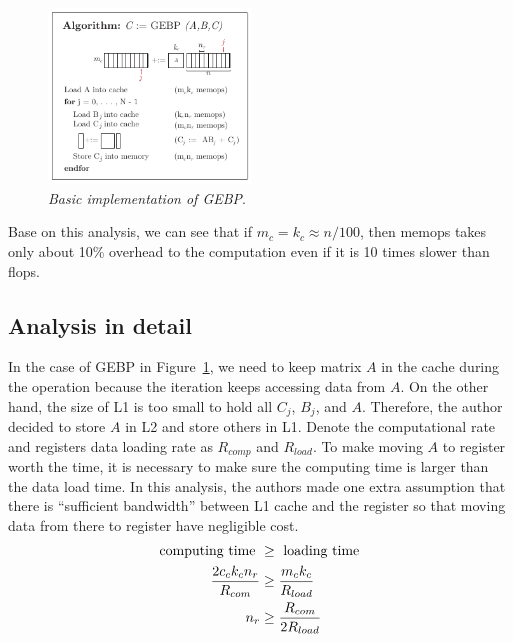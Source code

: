 \documentclass[a4paper,12pt]{article}
\begin{document}
 \begin{figure}
    \vspace{-1em}
    \centering
        \includegraphics[width=0.48\textwidth]{fmcs_a3_GEBP}
    \vspace{-1em}
    \caption{\emph{Basic implementation of GEBP}.}
    \label{fig:GEBP}
    \vspace{-3em}
\end{figure}

Base on this analysis, we can see that if $m_c = k_c \approx n/100$, then memops takes only about 10\% overhead to the computation even if it is 10 times slower than flops.

\subsection{Analysis in detail}
In the case of GEBP in Figure~\ref{fig:GEBP}, we need to keep matrix $A$ in the cache during the operation because the iteration keeps accessing data from $A$. On the other hand, the size of L1 is too small to hold all $C_j$, $B_j$, and $A$. Therefore, the author decided to store $A$ in L2 and store others in L1. Denote the computational rate and registers data loading rate as $R_{comp}$ and $R_{load}$. To make moving $A$ to register worth the time, it is necessary to make sure the computing time is larger than the data load time. In this analysis, the authors made one extra assumption that there is ``sufficient bandwidth'' between L1 cache and the register so that moving data from there to register have negligible cost.
\begin{equation*}
    \begin{aligned}
        \centering
        \mbox{computing time } & \ge \mbox{ loading time} \\
        \frac{2c_ck_cn_r}{R_{com}} & \ge \frac{m_ck_c}{R_{load}} \\
        n_r & \ge \frac{R_{com}}{2R_{load}}
    \end{aligned}
\end{equation*}
\end{document}
